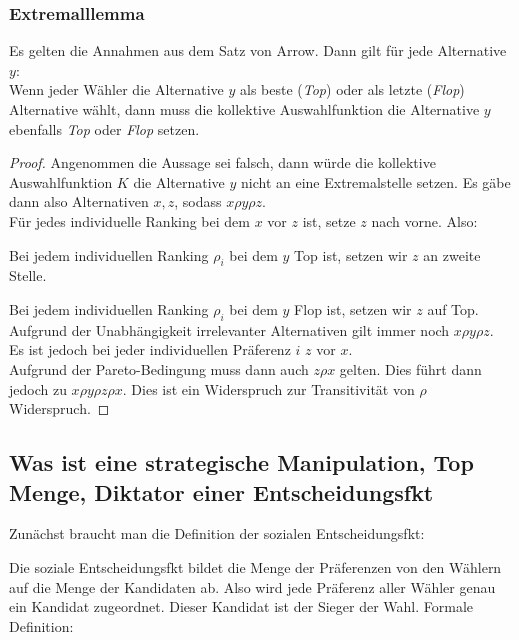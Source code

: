 \documentclass[]{article}
\begin{document}
\subsubsection*{Extremalllemma}
Es gelten die Annahmen aus dem Satz von Arrow. Dann gilt für jede Alternative $y$:\\
Wenn jeder Wähler die Alternative $y$ als beste (\textit{\glqq Top\grqq}) oder als letzte (\textit{\glqq Flop\grqq}) Alternative wählt, dann muss die kollektive Auswahlfunktion die Alternative $y$ ebenfalls \textit{\glqq Top\grqq} oder \textit{\glqq Flop\grqq} setzen. \\
\begin{proof}
	Angenommen die Aussage sei falsch, dann würde die kollektive Auswahlfunktion $K$ die Alternative $y$ nicht an eine Extremalstelle setzen. Es gäbe dann also Alternativen $x,z$, sodass $x \rho y \rho z$. \\
	
	Für jedes individuelle Ranking bei dem $x$ vor $z$ ist, setze $z$ nach vorne. Also: 
	
	Bei jedem individuellen Ranking $\rho_i$ bei dem $y$ \glqq Top\grqq{} ist, setzen wir $z$ an zweite Stelle. 
	
	Bei jedem individuellen Ranking $\rho_i$ bei dem $y$ \glqq Flop\grqq{} ist, setzen wir $z$ auf \glqq Top\grqq{}. \\
	
	Aufgrund der Unabhängigkeit irrelevanter Alternativen gilt immer noch  $x \rho y \rho z$. \\
	Es ist jedoch bei jeder individuellen Präferenz $i$ $z$ vor $x$. \\
	Aufgrund der Pareto-Bedingung muss dann auch $z \rho x$ gelten. Dies führt dann jedoch zu $x \rho y \rho z \rho x$. Dies ist ein Widerspruch zur Transitivität von $\rho$ Widerspruch.
\end{proof}


\subsection*{Was ist eine strategische Manipulation, Top Menge, Diktator einer Entscheidungsfkt}

Zunächst braucht man die Definition der sozialen Entscheidungsfkt:

Die soziale Entscheidungsfkt bildet die Menge der Präferenzen von den Wählern auf die Menge der Kandidaten ab. Also wird jede Präferenz aller Wähler genau ein Kandidat zugeordnet. Dieser Kandidat ist der Sieger der Wahl. Formale Definition: 
\end{document}

